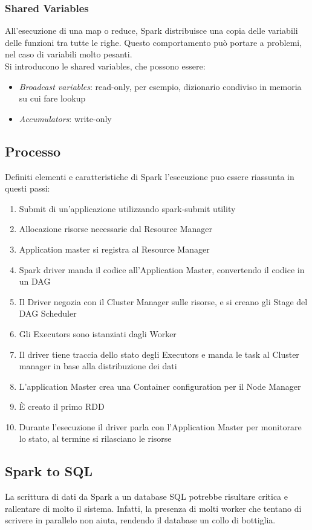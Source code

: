 \subsubsection{Shared Variables}
All'esecuzione di una map o reduce, Spark distribuisce una copia delle 
variabili delle funzioni tra tutte le righe. Questo comportamento 
può portare a problemi, nel caso di variabili molto pesanti.\\
Si introducono le shared variables, che possono essere:
\begin{itemize}
    \item \emph{Broadcast variables}: read-only, per esempio, dizionario 
    condiviso in memoria su cui fare lookup
    \item \emph{Accumulators}: write-only
\end{itemize}

\subsection{Processo}
Definiti elementi e caratteristiche di Spark l'esecuzione puo essere riassunta 
in questi passi:
\begin{enumerate}
    \item Submit di un'applicazione utilizzando spark-submit utility
    \item Allocazione risorse necessarie dal Resource Manager
    \item Application master si registra al Resource Manager
    \item Spark driver manda il codice all'Application Master, convertendo il codice
    in un DAG
    \item Il Driver negozia con il Cluster Manager sulle risorse, e si creano gli Stage del 
    DAG Scheduler
    \item Gli Executors sono istanziati dagli Worker
    \item Il driver tiene traccia dello stato degli Executors e manda le task al 
    Cluster manager in base alla distribuzione dei dati
    \item L'application Master crea una Container configuration per il Node Manager
    \item È creato il primo RDD
    \item Durante l'esecuzione il driver parla con l'Application Master per monitorare
    lo stato, al termine si rilasciano le risorse
\end{enumerate}

\subsection{Spark to SQL}
La scrittura di dati da Spark a un database SQL potrebbe risultare critica e 
rallentare di molto il sistema. Infatti, la presenza di molti worker che tentano
di scrivere in parallelo non aiuta, rendendo il database un collo di bottiglia.

